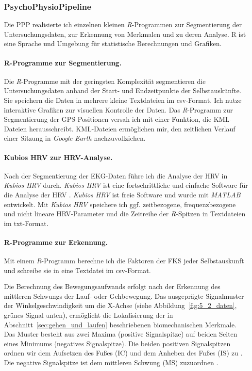\subsubsection{PsychoPhysioPipeline}
Die \ac{PPP} realisierte ich einzelnen kleinen \emph{R}-Programmen zur Segmentierung der Untersuchungsdaten, zur Erkennung von Merkmalen und zu deren Analyse. R ist eine Sprache und Umgebung für statistische Berechnungen und Grafiken.

\paragraph{R-Programme zur Segmentierung.}
Die \emph{R}-Programme mit der geringsten Komplexität segmentieren die Untersuchungsdaten anhand der Start- und Endzeitpunkte der Selbstauskünfte. Sie speichern die Daten in mehrere kleine Textdateien im \acs{csv}-Format. Ich nutze interaktive Grafiken zur visuellen Kontrolle der Daten. Das \emph{R}-Programm zur Segmentierung der \ac{GPS}-Positionen versah ich mit einer Funktion, die \acs{KML}-Dateien herausschreibt. \acs{KML}-Dateien ermöglichen mir, den zeitlichen Verlauf einer Sitzung in \emph{Google Earth} nachzuvollziehen.

\paragraph{Kubios HRV zur HRV-Analyse.}
Nach der Segmentierung der \ac{EKG}-Daten führe ich die Analyse der \ac{HRV} in \emph{Kubios HRV} durch. \emph{Kubios HRV} ist eine fortschrittliche und einfache Software für die Analyse der \ac{HRV} \citep{Tarvainen2014}. \emph{Kubios HRV} ist freie Software und wurde mit \emph{MATLAB} entwickelt. Mit \emph{Kubios HRV} speichere ich ggf. zeitbezogene, frequenzbezogene und nicht lineare \ac{HRV}-Parameter und die Zeitreihe der \emph{R}-Spitzen in Textdateien im txt-Format.

\paragraph{R-Programme zur Erkennung.}
\label{par:r_programme_zur_erkennung}
Mit einem \emph{R}-Programm berechne ich die Faktoren der \ac{FKS} jeder Selbstauskunft und schreibe sie in eine Textdatei im \acs{csv}-Format.

Die Berechnung des Bewegungsaufwands erfolgt nach der Erkennung des mittleren Schwungs der Lauf- oder Gehbewegung. Das ausgeprägte Signalmuster der Winkelgeschwindigkeit um die X-Achse (siehe Abbildung~\ref{fig:5_2_daten}, grünes Signal unten), ermöglicht die Lokalisierung der in Abschnitt~\ref{sec:gehen_und_laufen} beschriebenen biomechanischen Merkmale. Das Muster besteht aus zwei Maxima (positive Signalspitze) auf beiden Seiten eines Minimums (negatives Signalspitze). Die beiden positiven Signalspitzen ordnen wir dem Aufsetzen des Fußes (\ac{IC}) und dem Anheben des Fußes (\ac{IS}) zu \citep[vgl.][]{Aminian2002}. Die negative Signalspitze ist dem mittleren Schwung (MS) zuzuordnen \citep[vgl.][]{Aminian2002}.

